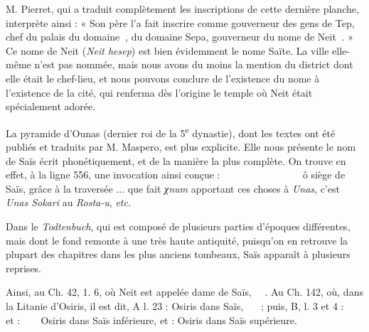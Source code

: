 \documentclass[a4paper, 11pt, oneside]{article}
\newcommand*\hieroglyhicsAAAD{}
\newcommand*\hieroglyhicsAAAF{}
\newcommand*\hieroglyhicsAAAG{}
\newcommand*\hieroglyhicsAAAH{}
\newcommand*\hieroglyhicsAAAI{}
\newcommand*\hieroglyhicsAAAW{\raisebox{0.5ex}{}}
\newcommand*\hieroglyhicsAABC{\raisebox{0.5ex}{}}
\newcommand*\hieroglyhicsAABG{}
\newcommand*\hieroglyhicsAABR{}
\newcommand*\hieroglyhicsAABU{}
\newcommand*\hieroglyhicsAABV{}
\newcommand*\hieroglyhicsAABW{}
\newcommand*\hieroglyhicsAABX{}
\newcommand*\hieroglyhicsAABY{\raisebox{0.5ex}{}}
\newcommand*\hieroglyhicsAABZ{}
\newcommand*\hieroglyhicsAACA{}
\newcommand*\hieroglyhicsAACB{\raisebox{0.5ex}{}}
\newcommand*\hieroglyhicsAACC{}
\newcommand*\hieroglyhicsAACD{}
\newcommand*\hieroglyhicsAACE{}
\newcommand*\hieroglyhicsAACF{}
\newcommand*\hieroglyhicsAACG{}
\newcommand*\hieroglyhicsAACH{}
\newcommand*\hieroglyhicsAACI{}
\newcommand*\hieroglyhicsAACJ{}
\newcommand*\hieroglyhicsAACK{}
\newcommand*\hieroglyhicsAACL{\raisebox{0.5ex}{}}
\newcommand*\hieroglyhicsAACM{}
\newcommand*\hieroglyhicsAACN{\raisebox{1ex}{}}
\newcommand*\hieroglyhicsAACO{}
\newcommand*\hieroglyhicsAACP{}
\newcommand*\hieroglyhicsAACQ{}
\newcommand*\hieroglyhicsAACR{}
\newcommand*\hieroglyhicsAACS{}
\newcommand*\hieroglyhicsAACT{}
\newcommand*\hieroglyhicsAACU{}
\newcommand*\hieroglyhicsAACV{}
\newcommand*\hieroglyhicsAACW{}
\newcommand*\hieroglyhicsAACX{}
\newcommand*\hieroglyhicsAACY{}
\newcommand*\hieroglyhicsAACZ{}
\newcommand*\hieroglyhicsAADA{}
\newcommand*\hieroglyhicsAADB{}
\newcommand*\hieroglyhicsAADC{\raisebox{0.5ex}{}}
\newcommand*\hieroglyhicsAADD{}
\newcommand*\hieroglyhicsAADE{}
\begin{document}
M. Pierret, qui a traduit complètement les inscriptions de cette dernière planche, interprète ainsi : « Son père l'a fait inscrire comme gouverneur des gens de Tep, chef du palais du domaine $\hieroglyhicsAABU\:\hieroglyhicsAABV$, du domaine Sepa, gouverneur du nome de Neit $\hieroglyhicsAABG\:\hieroglyhicsAABW$. » Ce nome de Neit (\emph{Neit hesep}) est bien évidemment le nome Saïte. La ville elle-même n'est pas nommée, mais nous avons du moins la mention du district dont elle était le chef-lieu, et nous pouvons conclure de l'existence du nome à l'existence de la cité, qui renferma dès l'origine le temple où Neit était spécialement adorée.

La pyramide d'Ounas (dernier roi de la 5\textsuperscript{e} dynastie), dont les textes ont été publiés et traduits par M. Maspero, est plus explicite. Elle nous présente le nom de Saïs écrit phonétiquement, et de la manière la plus complète. On trouve en effet, à la ligne 556, une invocation ainsi conçue : $\hieroglyhicsAABX\:\hieroglyhicsAABY\:\hieroglyhicsAABZ\:\hieroglyhicsAAAI\allowbreak\:\hieroglyhicsAACA\:\hieroglyhicsAACB\:\hieroglyhicsAAAW\:\hieroglyhicsAABR\:\hieroglyhicsAACC\allowbreak\:\hieroglyhicsAACD\:\hieroglyhicsAAAH\:\hieroglyhicsAACE\:\hieroglyhicsAAAH\allowbreak\:\hieroglyhicsAAAH\:\hieroglyhicsAACF\:\hieroglyhicsAACB\:\hieroglyhicsAACG\allowbreak\:\hieroglyhicsAACH\:\hieroglyhicsAACI\:\hieroglyhicsAAAH\:\hieroglyhicsAACJ\allowbreak\:\hieroglyhicsAACK\:\hieroglyhicsAACL\:\hieroglyhicsAACM\:\hieroglyhicsAACN\:\hieroglyhicsAACO\allowbreak\:\hieroglyhicsAACO\:\hieroglyhicsAACP\:\hieroglyhicsAACQ\:\hieroglyhicsAACN\allowbreak\:\hieroglyhicsAAAH\:\hieroglyhicsAACR\:\hieroglyhicsAACS\:\hieroglyhicsAACT\:\hieroglyhicsAACU$ ô siège de Saïs, grâce à la traversée ... que fait \emph{χnum} apportant ces choses à \emph{Unas}, c'est \emph{Unas Sokari} au \emph{Rosta-u}, \emph{etc.}

Dans le \emph{Todtenbuch}, qui est composé de plusieurs parties d'époques différentes, mais dont le fond remonte à une très haute antiquité, puisqu'on en retrouve la plupart des chapitres dans les plus anciens tombeaux, Saïs apparaît à plusieurs reprises.

Ainsi, au Ch. 42, 1. 6, où Neit est appelée dame de Saïs, $\hieroglyhicsAACV\:\hieroglyhicsAABC\:\hieroglyhicsAACW\:\hieroglyhicsAACX\:\hieroglyhicsAACY$. Au Ch. 142, où, dans la Litanie d'Osiris, il est dit, A l. 23 : Osiris dans Saïs, $\hieroglyhicsAACZ\:\hieroglyhicsAADA\:\hieroglyhicsAAAI\allowbreak\:\hieroglyhicsAAAG\:\hieroglyhicsAAAF\:\hieroglyhicsAADB$ ; puis, B, l. 3 et 4 : $\hieroglyhicsAACZ\:\hieroglyhicsAADA\:\hieroglyhicsAAAI\allowbreak\:\hieroglyhicsAADC\:\hieroglyhicsAAAW\:\hieroglyhicsAADD\:\hieroglyhicsAADB$ et : $\hieroglyhicsAACZ\:\hieroglyhicsAABR\:\hieroglyhicsAAAD\:\hieroglyhicsAADC\:\hieroglyhicsAAAW\:\hieroglyhicsAADE\:\hieroglyhicsAADB$ Osiris dans Saïs inférieure, et : Osiris dans Saïs supérieure.
\end{document}
